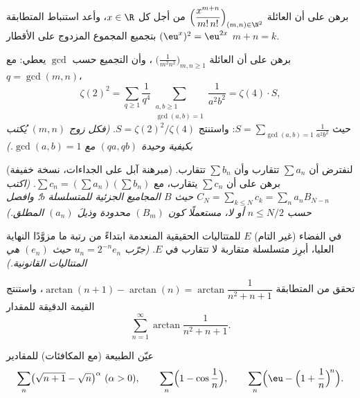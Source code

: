 \begin{exercise}[$\star\star$]\label{exo:b2:series:6}
برهن على أن العائلة
$\Bigl(\dfrac{x^{m+n}}{m!\,n!}\Bigr)_{(m,n)\in\N^2}$ 
من أجل كل $x \in \R$، وأعد استنباط المتطابقة $(\eu^x)^2 =
\eu^{2x}$ بتجميع المجموع المزدوج على الأقطار $m + n =
k$.
\end{exercise}

\begin{exercise}[$\star\star$]\label{exo:b2:series:7}
برهن على أن العائلة $\bigl(\frac{1}{m^2 n^2}\bigr)_{m,n \geq 1}$
، وأن التجميع حسب $\gcd$ يعطي: مع $q = \gcd(m,n)$،
\[
\zeta(2)^2 = \sum_{q\geq1} \frac{1}{q^4}
\sum_{\substack{a,b \geq 1\\ \gcd(a,b)=1}} \frac{1}{a^2b^2}
= \zeta(4) \cdot S,
\]
حيث $S = \sum_{\gcd(a,b)=1} \frac{1}{a^2b^2}$: واستنتج $S =
\zeta(2)^2/\zeta(4)$. \emph{(فكل زوج $(m,n)$ يُكتب بكيفية وحيدة
$(qa, qb)$ مع $\gcd(a,b) = 1$.)}
\end{exercise}

\begin{exercise}[$\star\star\star$]\label{exo:b2:series:8}
(مبرهنة آبل على الجداءات، نسخة خفيفة) لنفترض أن $\sum a_n$
تتقارب  وأن $\sum b_n$ تتقارب. برهن على أن
 $\sum c_n$ يتقارب، مع $\sum c_n = (\sum
a_n)(\sum b_n)$. \emph{(اكتب $C_N = \sum_{k\leq N} c_k = \sum_n
a_n B_{N-n}$ حيث $B$ المجاميع الجزئية للمتسلسلة $b$؛ وافصل حسب
$n \leq N/2$ أو لا، مستعملًا كون $(B_m)$ محدودة وذيلَ
$(a_n)$ المطلق.)}
\end{exercise}

\begin{exercise}[$\star\star\star$]\label{exo:b2:series:9}
في الفضاء (غير التام) $E$ للمتتاليات الحقيقية المنعدمة ابتداءً من رتبة ما
مزوَّدًا  النهاية العليا، أبرِز متسلسلة متقاربة  لا
تتقارب في $E$. \emph{(جرّب $u_n = 2^{-n} e_n$ حيث $(e_n)$ هي
المتتاليات القانونية.)}
\end{exercise}

\begin{exercise}[$\star\star$]\label{exo:b2:series:10}
تحقق من المتطابقة $\arctan(n+1) - \arctan(n) =
\arctan\dfrac{1}{n^2 + n + 1}$، واستنتج القيمة الدقيقة للمقدار
\[
\sum_{n=1}^{\infty} \arctan\frac{1}{n^2 + n + 1} .
\]
\end{exercise}

\begin{exercise}[$\star\star$]\label{exo:b2:series:11}
عيّن الطبيعة (مع المكافئات) للمقادير
\[
\sum_n \bigl(\sqrt{n+1} - \sqrt n\bigr)^{\alpha}
\ (\alpha > 0), \qquad
\sum_n \Bigl(1 - \cos\frac1n\Bigr), \qquad
\sum_n \Bigl(\eu - \Bigl(1 + \frac1n\Bigr)^{\!n}\Bigr).
\]
\end{exercise}

